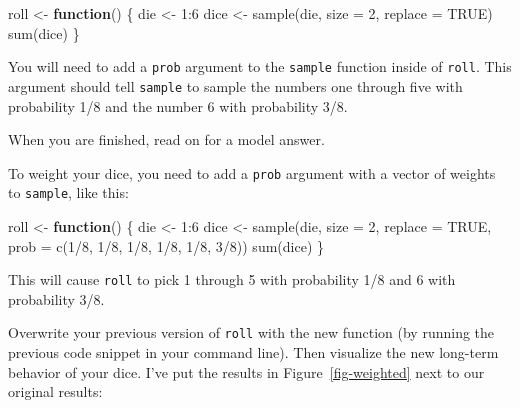 \documentclass[
  letterpaper,
  DIV=11,
  numbers=noendperiod]{scrbook}
\newenvironment{Shaded}{\begin{snugshade}}{\end{snugshade}}
\newcommand{\AttributeTok}[1]{\textcolor[rgb]{0.40,0.45,0.13}{#1}}
\newcommand{\ConstantTok}[1]{\textcolor[rgb]{0.56,0.35,0.01}{#1}}
\newcommand{\ControlFlowTok}[1]{\textcolor[rgb]{0.00,0.23,0.31}{\textbf{#1}}}
\newcommand{\DecValTok}[1]{\textcolor[rgb]{0.68,0.00,0.00}{#1}}
\newcommand{\FunctionTok}[1]{\textcolor[rgb]{0.28,0.35,0.67}{#1}}
\newcommand{\NormalTok}[1]{\textcolor[rgb]{0.00,0.23,0.31}{#1}}
\newcommand{\OtherTok}[1]{\textcolor[rgb]{0.00,0.23,0.31}{#1}}
\newcommand{\SpecialCharTok}[1]{\textcolor[rgb]{0.37,0.37,0.37}{#1}}
\begin{document}
\begin{Shaded}
\begin{Highlighting}[]
\NormalTok{roll }\OtherTok{\textless{}{-}} \ControlFlowTok{function}\NormalTok{() \{}
\NormalTok{  die }\OtherTok{\textless{}{-}} \DecValTok{1}\SpecialCharTok{:}\DecValTok{6}
\NormalTok{  dice }\OtherTok{\textless{}{-}} \FunctionTok{sample}\NormalTok{(die, }\AttributeTok{size =} \DecValTok{2}\NormalTok{, }\AttributeTok{replace =} \ConstantTok{TRUE}\NormalTok{)}
  \FunctionTok{sum}\NormalTok{(dice)}
\NormalTok{\}}
\end{Highlighting}
\end{Shaded}

You will need to add a \texttt{prob} argument to the \texttt{sample}
function inside of \texttt{roll}. This argument should tell
\texttt{sample} to sample the numbers one through five with probability
1/8 and the number 6 with probability 3/8.

When you are finished, read on for a model answer.

To weight your dice, you need to add a \texttt{prob} argument with a
vector of weights to \texttt{sample}, like this:

\begin{Shaded}
\begin{Highlighting}[]
\NormalTok{roll }\OtherTok{\textless{}{-}} \ControlFlowTok{function}\NormalTok{() \{}
\NormalTok{  die }\OtherTok{\textless{}{-}} \DecValTok{1}\SpecialCharTok{:}\DecValTok{6}
\NormalTok{  dice }\OtherTok{\textless{}{-}} \FunctionTok{sample}\NormalTok{(die, }\AttributeTok{size =} \DecValTok{2}\NormalTok{, }\AttributeTok{replace =} \ConstantTok{TRUE}\NormalTok{, }
    \AttributeTok{prob =} \FunctionTok{c}\NormalTok{(}\DecValTok{1}\SpecialCharTok{/}\DecValTok{8}\NormalTok{, }\DecValTok{1}\SpecialCharTok{/}\DecValTok{8}\NormalTok{, }\DecValTok{1}\SpecialCharTok{/}\DecValTok{8}\NormalTok{, }\DecValTok{1}\SpecialCharTok{/}\DecValTok{8}\NormalTok{, }\DecValTok{1}\SpecialCharTok{/}\DecValTok{8}\NormalTok{, }\DecValTok{3}\SpecialCharTok{/}\DecValTok{8}\NormalTok{))}
  \FunctionTok{sum}\NormalTok{(dice)}
\NormalTok{\}}
\end{Highlighting}
\end{Shaded}

This will cause \texttt{roll} to pick 1 through 5 with probability 1/8
and 6 with probability 3/8.

Overwrite your previous version of \texttt{roll} with the new function
(by running the previous code snippet in your command line). Then
visualize the new long-term behavior of your dice. I've put the results
in Figure~\ref{fig-weighted} next to our original results:
\end{document}

